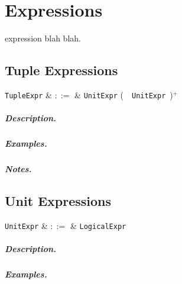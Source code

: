 \chapter{Expressions}
\Gls{expression} blah blah.


\section{Tuple Expressions}
\label{c_expr_tuple}

\begin{syntax}
  \verb+TupleExpr+ & $::=$ & \verb+UnitExpr+ \big(\ \token{,}\ \verb+UnitExpr+\ \big)$^+$ \\
\end{syntax}

\paragraph{Description.}

\paragraph{Examples.}

\paragraph{Notes.} 


\section{Unit Expressions}
\label{c_expr_unit}

\begin{syntax}
  \verb+UnitExpr+ & $::=$ & \verb+LogicalExpr+\\
\end{syntax}

\paragraph{Description.}

\paragraph{Examples.}

